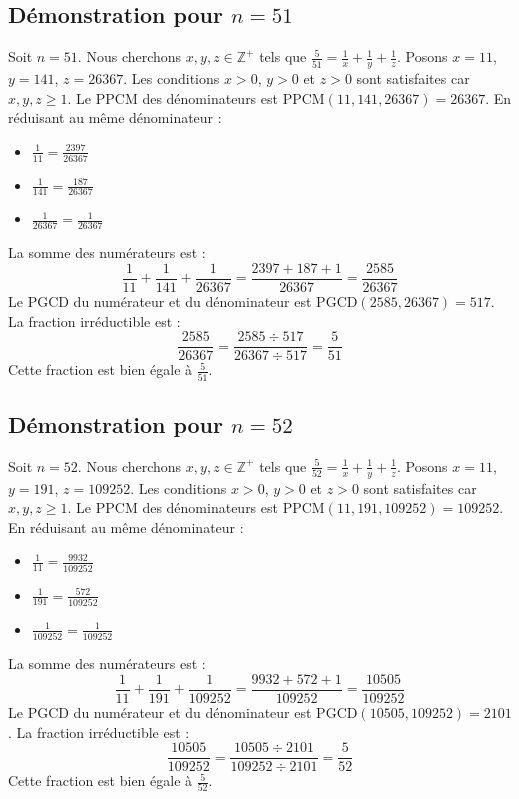 \documentclass[11pt,a4paper]{article}
\begin{document}
\subsection{Démonstration pour $n = 51$}
Soit $n = 51$. Nous cherchons $x, y, z \in \mathbb{Z}^{+}$ tels que $\frac{5}{51} = \frac{1}{x} + \frac{1}{y} + \frac{1}{z}$.
Posons $x = 11$, $y = 141$, $z = 26367$.
Les conditions $x > 0$, $y > 0$ et $z > 0$ sont satisfaites car $x, y, z \geq 1$.
Le PPCM des dénominateurs est $\text{PPCM}(11, 141, 26367) = 26367$.
En réduisant au même dénominateur :
\begin{itemize}
    \item $\frac{1}{11} = \frac{2397}{26367}$
    \item $\frac{1}{141} = \frac{187}{26367}$
    \item $\frac{1}{26367} = \frac{1}{26367}$
\end{itemize}
La somme des numérateurs est :
$$ \frac{1}{11} + \frac{1}{141} + \frac{1}{26367} = \frac{2397 + 187 + 1}{26367} = \frac{2585}{26367} $$
Le PGCD du numérateur et du dénominateur est $\text{PGCD}(2585, 26367) = 517$.
La fraction irréductible est :
$$ \frac{2585}{26367} = \frac{2585 \div 517}{26367 \div 517} = \frac{5}{51} $$
Cette fraction est bien égale à $\frac{5}{51}$.

\subsection{Démonstration pour $n = 52$}
Soit $n = 52$. Nous cherchons $x, y, z \in \mathbb{Z}^{+}$ tels que $\frac{5}{52} = \frac{1}{x} + \frac{1}{y} + \frac{1}{z}$.
Posons $x = 11$, $y = 191$, $z = 109252$.
Les conditions $x > 0$, $y > 0$ et $z > 0$ sont satisfaites car $x, y, z \geq 1$.
Le PPCM des dénominateurs est $\text{PPCM}(11, 191, 109252) = 109252$.
En réduisant au même dénominateur :
\begin{itemize}
    \item $\frac{1}{11} = \frac{9932}{109252}$
    \item $\frac{1}{191} = \frac{572}{109252}$
    \item $\frac{1}{109252} = \frac{1}{109252}$
\end{itemize}
La somme des numérateurs est :
$$ \frac{1}{11} + \frac{1}{191} + \frac{1}{109252} = \frac{9932 + 572 + 1}{109252} = \frac{10505}{109252} $$
Le PGCD du numérateur et du dénominateur est $\text{PGCD}(10505, 109252) = 2101$.
La fraction irréductible est :
$$ \frac{10505}{109252} = \frac{10505 \div 2101}{109252 \div 2101} = \frac{5}{52} $$
Cette fraction est bien égale à $\frac{5}{52}$.
\end{document}
